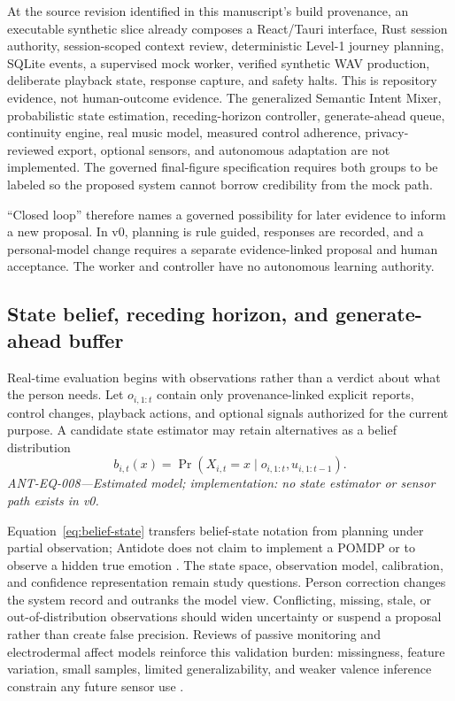 At the source revision identified in this manuscript's build provenance, an
executable synthetic slice already composes a React/Tauri interface, Rust
session authority, session-scoped context review, deterministic Level-1
journey planning, SQLite events, a supervised mock worker, verified synthetic
WAV production, deliberate playback state, response capture, and safety halts.
This is repository evidence, not human-outcome evidence. The generalized
Semantic Intent Mixer, probabilistic state estimation, receding-horizon
controller, generate-ahead queue, continuity engine, real music model, measured
control adherence, privacy-reviewed export, optional sensors, and autonomous
adaptation are not implemented. The governed final-figure specification
requires both groups to be labeled so the proposed system cannot borrow
credibility from the mock path.

``Closed loop'' therefore names a governed possibility for later evidence to
inform a new proposal. In v0, planning is rule guided, responses are recorded,
and a personal-model change requires a separate evidence-linked proposal and
human acceptance. The worker and controller have no autonomous learning
authority.


\subsection{State belief, receding horizon, and generate-ahead buffer}
\label{sec:design-predictive-horizon}

Real-time evaluation begins with observations rather than a verdict about what
the person needs. Let $o_{i,1:t}$ contain only provenance-linked explicit
reports, control changes, playback actions, and optional signals authorized for
the current purpose. A candidate state estimator may retain alternatives as a
belief distribution
\begin{equation}
  b_{i,t}(x)
  = \Pr\!\left(
      X_{i,t}=x
      \mid o_{i,1:t},u_{i,1:t-1}
    \right).
  \label{eq:belief-state}
\end{equation}
\noindent\textit{ANT-EQ-008---Estimated model; implementation: no state estimator or sensor path exists in v0.}

Equation~\ref{eq:belief-state} transfers belief-state notation from planning
under partial observation; Antidote does not claim to implement a POMDP or to
observe a hidden true emotion \citep{kaelbling1998pomdp}. The state space,
observation model, calibration, and confidence representation remain study
questions. Person correction changes the system record and outranks the model
view. Conflicting, missing, stale, or out-of-distribution observations should
widen uncertainty or suspend a proposal rather than create false precision.
Reviews of passive monitoring and electrodermal affect models reinforce this
validation burden: missingness, feature variation, small samples, limited
generalizability, and weaker valence inference constrain any future sensor use
\citep{deangel2022passive,damelio2025eda}.

